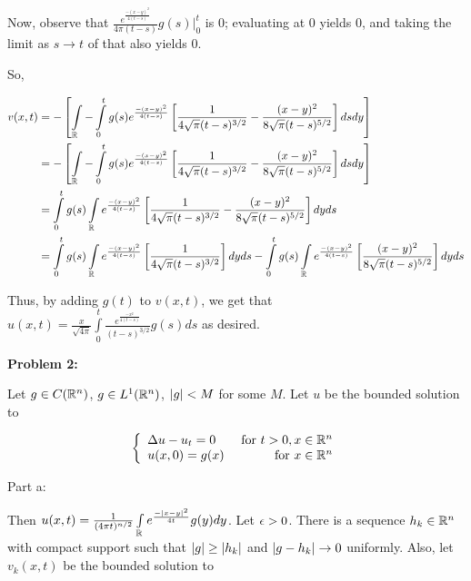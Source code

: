 \documentclass[a4paper,12pt]{article}
\begin{document}
Now, observe that $\frac{e^{\frac{-(x-y)^2}{4(t-s)}}}{4\pi(t-s)} g(s) \Big|_0^t$ is $0$; evaluating at $0$ yields $0$, and taking the limit as $s \to t$ of that also yields $0$. %

So,

\begin{align*}
v(x,t) &= -\left[ \int\limits_{\mathbb{R}} - \int\limits_0^t g(s) e^{\frac{-(x-y)^2}{4(t-s)}} \left[ \frac{1}{4 \sqrt{\pi} (t-s)^{3/2}} -  \frac{(x-y)^2}{8 \sqrt{\pi} (t-s)^{5/2}}\right]  dsdy \right]\\
&= -\left[ \int\limits_{\mathbb{R}} - \int\limits_0^t g(s) e^{\frac{-(x-y)^2}{4(t-s)}} \left[ \frac{1}{4 \sqrt{\pi} (t-s)^{3/2}} -  \frac{(x-y)^2}{8 \sqrt{\pi} (t-s)^{5/2}}\right]  dsdy \right]\\
&=  \int\limits_0^t g(s)\int\limits_{\mathbb{R}} e^{\frac{-(x-y)^2}{4(t-s)}} \left[ \frac{1}{4 \sqrt{\pi} (t-s)^{3/2}} -  \frac{(x-y)^2}{8 \sqrt{\pi} (t-s)^{5/2}} \right] dyds\\
&=  \int\limits_0^t g(s)\int\limits_{\mathbb{R}} e^{\frac{-(x-y)^2}{4(t-s)}} \left[ \frac{1}{4 \sqrt{\pi} (t-s)^{3/2}}\right]dyds - \int\limits_0^t g(s)\int\limits_{\mathbb{R}} e^{\frac{-(x-y)^2}{4(t-s)}} \left[ \frac{(x-y)^2}{8 \sqrt{\pi} (t-s)^{5/2}} \right] dyds\\
\end{align*} %

Thus, by adding $g(t)$ to $v(x,t)$, we get that $u(x,t) = \frac{x}{\sqrt{4\pi}} \int\limits_0^t \frac{e^{\frac{-x^2}{4(t-s)}}}{(t-s)^{3/2}} g(s) ds$ as desired.


\shunt

{\bf Problem 2:}

Let $g \in C(\mathbb{R}^n)$, $g \in L^1(\mathbb{R}^n)$, $\left\lvert g \right\rvert < M$ for some $M$. Let $u$ be the bounded solution to 

\begin{displaymath}
   \left\{
     \begin{array}{lr}
       \Delta u -u_t  = 0 & \text{ for } t>0, x \in \mathbb{R}^n \\
       u(x,0) = g(x) & \text{ for } x \in \mathbb{R}^n
     \end{array}
   \right.
\end{displaymath}

Part a:

Then $u(x,t) = \frac{1}{(4\pi t)^{n/2}}\int\limits_{\mathbb{R}} e^{\frac{-\left\lvert x-y \right\rvert^2}{4t}} g(y) dy$. Let $\epsilon >0$. There is a sequence $h_k \in \mathbb{R}^n$ with compact support such that $\left\lvert g \right\rvert\geq \left\lvert h_k \right\rvert$ and $\left\lvert g-h_k \right\rvert \to 0$ uniformly. Also, let $v_k(x,t)$ be the bounded solution to
\end{document}
